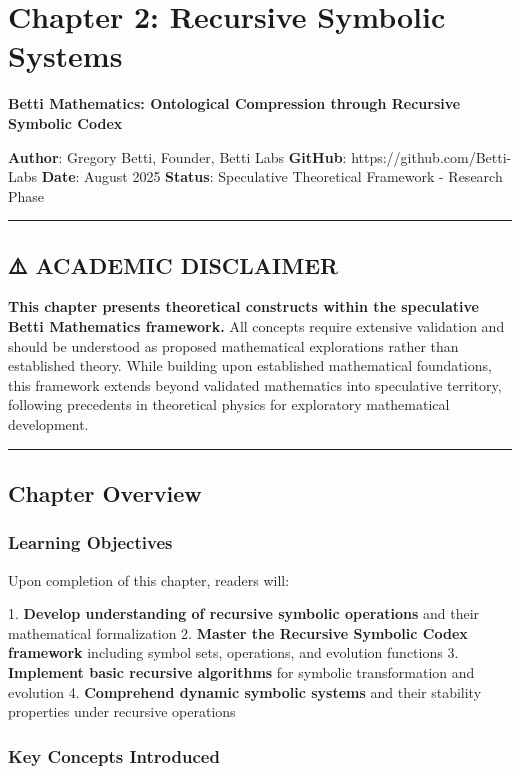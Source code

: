 \chapter{Chapter 2: Recursive Symbolic Systems}

\textbf{Betti Mathematics: Ontological Compression through Recursive Symbolic Codex}

\textbf{Author}: Gregory Betti, Founder, Betti Labs  
\textbf{GitHub}: https://github.com/Betti-Labs  
\textbf{Date}: August 2025  
\textbf{Status}: Speculative Theoretical Framework - Research Phase

\hrule

\section{⚠️ ACADEMIC DISCLAIMER}

\textbf{This chapter presents theoretical constructs within the speculative Betti Mathematics framework.} All concepts require extensive validation and should be understood as proposed mathematical explorations rather than established theory. While building upon established mathematical foundations, this framework extends beyond validated mathematics into speculative territory, following precedents in theoretical physics for exploratory mathematical development.

\hrule

\section{Chapter Overview}

\subsection{Learning Objectives}

Upon completion of this chapter, readers will:

1. \textbf{Develop understanding of recursive symbolic operations} and their mathematical formalization
2. \textbf{Master the Recursive Symbolic Codex framework} including symbol sets, operations, and evolution functions
3. \textbf{Implement basic recursive algorithms} for symbolic transformation and evolution
4. \textbf{Comprehend dynamic symbolic systems} and their stability properties under recursive operations

\subsection{Key Concepts Introduced}

